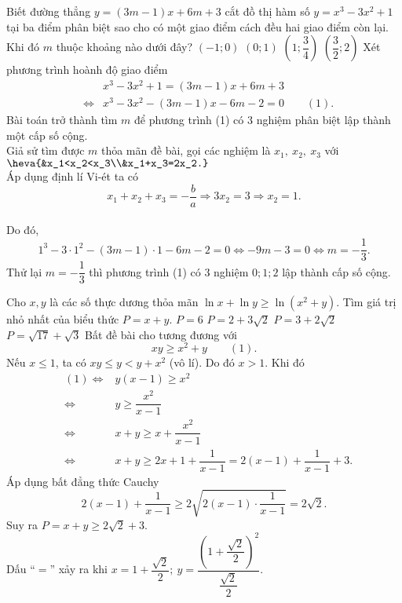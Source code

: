 \begin{ex}%
	Biết đường thẳng $y=(3m-1)x+6m+3$ cắt đồ thị hàm số $y=x^3-3x^2+1$ tại ba điểm phân biệt sao cho có một giao điểm cách đều hai giao điểm còn lại. Khi đó $m$ thuộc khoảng nào dưới đây?
	\choice
	{\True $(-1;0)$}
	{$(0;1)$}
	{$\left(1;\dfrac{3}{4}\right)$}
	{$\left(\dfrac{3}{2};2\right)$}
	\loigiai
	{
		Xét phương trình hoành độ giao điểm
		\begin{eqnarray*}
			& & x^3-3x^2+1=(3m-1)x+6m+3\\
			& \Leftrightarrow & x^3-3x^2-(3m-1)x-6m-2=0\qquad(1).
		\end{eqnarray*}
		Bài toán trở thành tìm $m$ để phương trình (1) có $3$ nghiệm phân biệt lập thành một cấp số cộng.\\
		Giả sử tìm được $m$ thỏa mãn đề bài, gọi các nghiệm là $x_1,~x_2,~x_3$ với $\heva{&x_1<x_2<x_3\\&x_1+x_3=2x_2.}$\\
		Áp dụng định lí Vi-ét ta có $$x_1+x_2+x_3=-\dfrac{b}{a}\Rightarrow3x_2=3\Rightarrow x_2=1.$$\\
		Do đó, $$1^3-3\cdot1^2-(3m-1)\cdot1-6m-2=0\Leftrightarrow-9m-3=0\Leftrightarrow m=-\dfrac{1}{3}.$$
		Thử lại $m=-\dfrac{1}{3}$ thì phương trình (1) có $3$ nghiệm $0;1;2$ lập thành cấp số cộng.
	}
\end{ex}

\begin{ex}%
	Cho $x,y$ là các số thực dương thỏa mãn $\ln x+\ln y\geq\ln\left(x^2+y\right)$. Tìm giá trị nhỏ nhất của biểu thức $P=x+y$.
	\choice
	{$P=6$}
	{$P=2+3\sqrt{2}$}
	{\True $P=3+2\sqrt{2}$}
	{$P=\sqrt{17}+\sqrt{3}$}
	\loigiai
	{
		Bất đề bài cho tương đương với $$xy\ge x^2+y\qquad(1).$$
		Nếu $x\le1$, ta có $xy\le y <y+x^2$ (vô lí). Do đó $x>1$.
		Khi đó
		\begin{eqnarray*}
			& (1)\Leftrightarrow & y(x-1)\ge x^2\\
			& \Leftrightarrow & y\ge \dfrac{x^2}{x-1}\\
			& \Leftrightarrow & x+y\ge x+\dfrac{x^2}{x-1}\\
			& \Leftrightarrow & x+y\ge 2x+1+\dfrac{1}{x-1}=2(x-1)+\dfrac{1}{x-1}+3.
		\end{eqnarray*}
	Áp dụng bất đẳng thức Cauchy
	$$2(x-1)+\dfrac{1}{x-1}\ge2\sqrt{2(x-1)\cdot\dfrac{1}{x-1}}=2\sqrt{2}.$$
	Suy ra $P=x+y\ge2\sqrt{2}+3$.\\
	Dấu ``$=$'' xảy ra khi $x=1+\dfrac{\sqrt{2}}{2};~y=\dfrac{\left(1+\dfrac{\sqrt{2}}{2}\right)^2}{\dfrac{\sqrt{2}}{2}}$.
	}
\end{ex}

